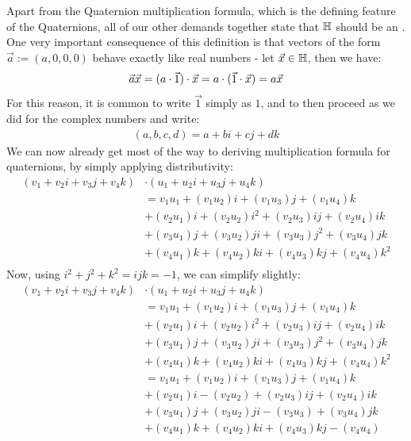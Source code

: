 Apart from the Quaternion multiplication formula, which is the defining feature of the Quaternions, all of our other demands together state that $\mathbb{H}$ should be an .
\newpar
One very important consequence of this definition is that vectors of the form $\vec a := (a,0,0,0)$ behave exactly like real numbers - let $\vec x \in \mathbb{H}$, then we have:
\begin{align*}
	\vec a \vec x = (a \cdot \vec1) \cdot \vec{x} = a \cdot (\vec 1 \cdot \vec{x}) = a \vec{x}
\end{align*}
For this reason, it is common to write $\vec 1$ simply as $1$, and to then proceed as we did for the complex numbers and write:
\begin{align*}
	(a,b,c,d) = a + bi + cj + dk
\end{align*}
We can now already get most of the way to deriving multiplication formula for quaternions, by simply applying distributivity:
\begin{align*}
	(v_1 + v_2i + v_3j + v_4k) &\cdot (u_1 + u_2i + u_3j + u_4k)\\
	&= v_1u_1 + (v_1u_2)i + (v_1u_3)j + (v_1u_4)k\\
	&+ (v_2u_1)i + (v_2u_2)i^2 + (v_2u_3)ij + (v_2u_4)ik\\
	&+ (v_3u_1)j + (v_3u_2)ji + (v_3u_3)j^2 + (v_3u_4)jk\\
	&+ (v_4u_1)k + (v_4u_2)ki + (v_4u_3)kj + (v_4u_4)k^2\\
\end{align*}
Now, using $i^2 + j^2 + k^2 = ijk = -1$, we can simplify slightly:
\begin{align*}
	(v_1 + v_2i + v_3j + v_4k) &\cdot (u_1 + u_2i + u_3j + u_4k)\\
	&= 
		v_1u_1 + (v_1u_2)i + (v_1u_3)j + (v_1u_4)k\\
	&+ (v_2u_1)i + (v_2u_2)i^2 + (v_2u_3)ij + (v_2u_4)ik\\
	&+ (v_3u_1)j + (v_3u_2)ji + (v_3u_3)j^2 + (v_3u_4)jk\\
	&+ (v_4u_1)k + (v_4u_2)ki + (v_4u_3)kj + (v_4u_4)k^2\\
	&= 
		v_1u_1 + (v_1u_2)i + (v_1u_3)j + (v_1u_4)k\\
	&+ (v_2u_1)i - (v_2u_2) + (v_2u_3)ij + (v_2u_4)ik\\
	&+ (v_3u_1)j + (v_3u_2)ji - (v_3u_3) + (v_3u_4)jk\\
	&+ (v_4u_1)k + (v_4u_2)ki + (v_4u_3)kj - (v_4u_4)\\
\end{align*}
\newpar
